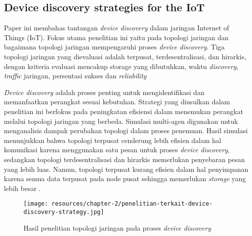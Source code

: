 \subsection{Device discovery strategies for the IoT}
Paper ini membahas tantangan \textit{device discovery} dalam jaringan Internet of Things (IoT). Fokus utama penelitian ini yaitu pada topologi jaringan dan bagaimana topologi jaringan mempengaruhi proses \textit{device discovery}. Tiga topologi jaringan yang dievaluasi adalah terpusat, terdesentralisasi, dan hirarkis, dengan kriteria evaluasi mencakup storage yang dibutuhkan, waktu \textit{discovery}, \textit{traffic} jaringan, persentasi sukses dan \textit{reliability}

\textit{Device discovery} adalah proses penting untuk mengidentifikasi dan memanfaatkan perangkat sesuai kebutuhan. Strategi yang diusulkan dalam penelitian ini berfokus pada peningkatan efisiensi dalam menemukan perangkat melalui topologi jaringan yang berbeda. Simulasi multi-agen digunakan untuk menganalisis dampak perubahan topologi dalam proses penemuan. Hasil simulasi menunjukkan bahwa topologi terpusat cenderung lebih efisien dalam hal komunikasi karena menggunakan satu pesan untuk proses \textit{device discovery}, sedangkan topologi terdesentralisasi dan hirarkis memerlukan penyebaran pesan yang lebih luas. Namun, topologi terpusat kurang efisien dalam hal penyimpanan karena semua data terpusat pada node pusat sehingga memerlukan \textit{storage} yang lebih besar \parencite{DeviceDiscovery}.

\begin{figure}[h]
  \centering
  \texttt{[image: resources/chapter-2/penelitian-terkait-device-discovery-strategy.jpg]}
  \caption{Hasil penelitian topologi jaringan pada proses \textit{device discovery} \parencite{DeviceDiscovery}}
  \label{fig:stragey-for-device-discovery}
\end{figure}

